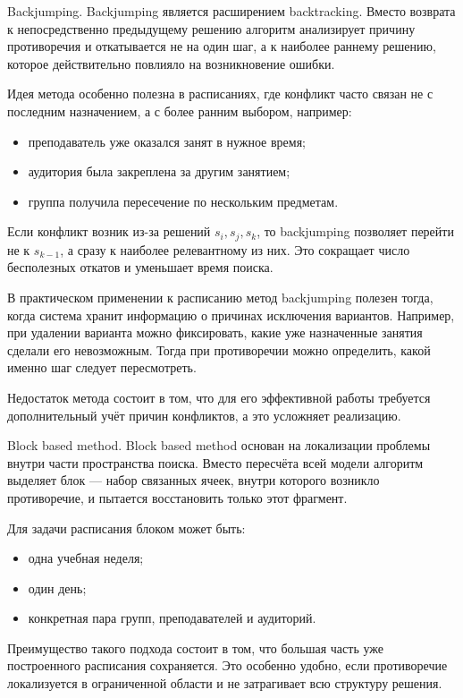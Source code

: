 Backjumping. Backjumping является расширением backtracking.
 Вместо возврата к непосредственно предыдущему решению алгоритм анализирует причину противоречия и откатывается не на один шаг, а к наиболее раннему решению, которое действительно повлияло на возникновение ошибки.

 Идея метода особенно полезна в расписаниях, где конфликт часто связан не с последним назначением, а с более ранним выбором, например:
 \begin{itemize}
 	\item преподаватель уже оказался занят в нужное время;
 	\item аудитория была закреплена за другим занятием;
 	\item группа получила пересечение по нескольким предметам.
 \end{itemize}

 Если конфликт возник из-за решений $s_i, s_j, s_k$, то backjumping позволяет перейти не к $s_{k-1}$, а сразу к наиболее релевантному из них.
 Это сокращает число бесполезных откатов и уменьшает время поиска.

 В практическом применении к расписанию метод backjumping полезен тогда, когда система хранит информацию о причинах исключения вариантов.
 Например, при удалении варианта можно фиксировать, какие уже назначенные занятия сделали его невозможным.
 Тогда при противоречии можно определить, какой именно шаг следует пересмотреть.

 Недостаток метода состоит в том, что для его эффективной работы требуется дополнительный учёт причин конфликтов, а это усложняет реализацию.

 Block based method. Block based method основан на локализации проблемы внутри части пространства поиска.
 Вместо пересчёта всей модели алгоритм выделяет блок --- набор связанных ячеек, внутри которого возникло противоречие, и пытается восстановить только этот фрагмент.

 Для задачи расписания блоком может быть:
 \begin{itemize}
 	\item одна учебная неделя;
 	\item один день;
 	\item конкретная пара групп, преподавателей и аудиторий.
 \end{itemize}

 Преимущество такого подхода состоит в том, что большая часть уже построенного расписания сохраняется.
 Это особенно удобно, если противоречие локализуется в ограниченной области и не затрагивает всю структуру решения.

